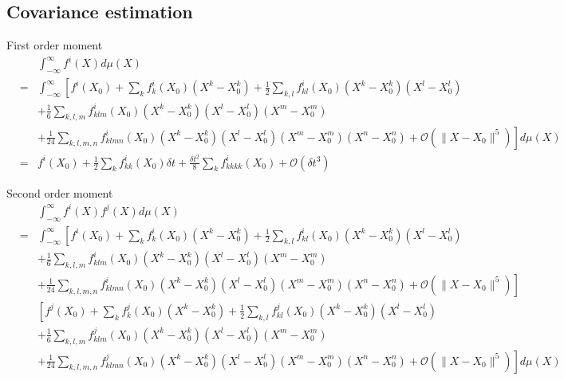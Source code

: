 \documentclass[12pt]{article}
\begin{document}
\subsection{Covariance estimation}

First order moment
\begin{eqnarray}
&&\int_{-\infty}^{\infty} f^i(X) d\mu(X) \\
&= & \int_{-\infty}^{\infty} \left[ f^i(X_0) + \sum_k f^i_k(X_0) (X^k-X_0^k)  + \frac{1}{2} \sum_{k,l} f^i_{kl}(X_0) (X^k-X_0^k) (X^l-X_0^l)  \right. \\
&& + \frac{1}{6} \sum_{k,l,m} f^i_{klm} (X_0) (X^k-X_0^k) (X^l-X_0^l) (X^m-X_0^m) \\
&& \left. + \frac{1}{24} \sum_{k,l,m,n} f^i_{klmn} (X_0) (X^k-X_0^k) (X^l-X_0^l) (X^m-X_0^m) (X^n-X_0^n)
+ \mathcal{O}\left( \| X- X_0 \|^5 \right) \right] d\mu(X) \\
&=& f^i(X_0) + \frac{1}{2} \sum_k f^i_{kk}(X_0) \delta t + \frac{\delta t^2}{8} \sum_{k} f^i_{kkkk} (X_0) + \mathcal{O} (\delta t^3 )
\end{eqnarray}

Second order moment
\begin{eqnarray}
&&\int_{-\infty}^{\infty} f^i(X) f^j(X) d\mu(X) \\
&= &
\int_{-\infty}^{\infty} \left[ f^i(X_0) + \sum_k f^i_k(X_0) (X^k-X_0^k)  + \frac{1}{2} \sum_{k,l} f^i_{kl}(X_0) (X^k-X_0^k) (X^l-X_0^l) \right. \\
&&  + \frac{1}{6} \sum_{k,l,m} f^i_{klm} (X_0) (X^k-X_0^k) (X^l-X_0^l) (X^m-X_0^m) \\
&& \left. + \frac{1}{24} \sum_{k,l,m,n} f^i_{klmn} (X_0) (X^k-X_0^k) (X^l-X_0^l) (X^m-X_0^m) (X^n-X_0^n)
+ \mathcal{O}\left( \| X- X_0 \|^5 \right) \right]  \\
&& \left[ f^j(X_0) + \sum_k f^j_k(X_0) (X^k-X_0^k)  + \frac{1}{2} \sum_{k,l} f^j_{kl}(X_0) (X^k-X_0^k) (X^l-X_0^l)  \right. \\
&&  + \frac{1}{6} \sum_{k,l,m} f^j_{klm} (X_0) (X^k-X_0^k) (X^l-X_0^l) (X^m-X_0^m)  \\
&&  \left. + \frac{1}{24} \sum_{k,l,m,n} f^j_{klmn} (X_0) (X^k-X_0^k) (X^l-X_0^l) (X^m-X_0^m) (X^n-X_0^n)
+ \mathcal{O}\left( \| X- X_0 \|^5 \right) \right]  d\mu(X) 
\end{eqnarray}
\end{document}
